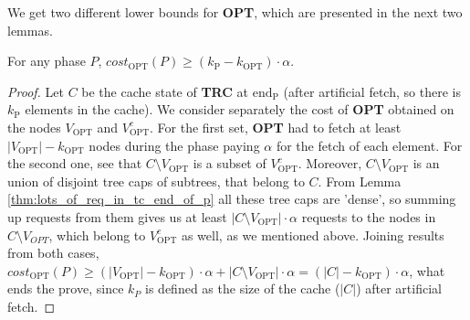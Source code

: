 We get two different lower bounds for \textbf{OPT}, which are presented in the
next two lemmas.
\begin{lemma}
For any phase $P$, $cost_{\mathrm{OPT}}(P) \geq
(k_{\mathrm{P}} - k_{\mathrm{OPT}}) \cdot \alpha$.  \label{thm:opt_bound_with_k}
\end{lemma}
\begin{proof}
Let $C$ be the cache state of \textbf{TRC} at
$\mathrm{end_P}$ (after artificial fetch, so there is $k_{\mathrm{P}}$ elements in the
cache). We consider separately the cost of \textbf{OPT} obtained on the nodes
$V_{\mathrm{OPT}}$ and $V_{\mathrm{OPT}}^c$. For the first set, \textbf{OPT} had
to fetch at least $|V_{\mathrm{OPT}}| - k_{\mathrm{OPT}}$ nodes during the phase
paying $\alpha$ for the fetch of each element. For the second one, see that $C \setminus
V_{\mathrm{OPT}}$ is a subset of $V_{\mathrm{OPT}}^c$. Moreover, $C \setminus
V_{\mathrm{OPT}}$ is an union of disjoint tree caps of subtrees, that belong to
$C$. From Lemma \ref{thm:lots_of_req_in_tc_end_of_p} all these tree caps are
'dense', so summing up requests from them gives us at least $|C \setminus
V_{\mathrm{OPT}}| \cdot \alpha$ requests to the nodes in $C \setminus V_{OPT}$,
which belong to $V_{\mathrm{OPT}}^c$ as well, as we mentioned above. Joining
results from both cases, $cost_{\mathrm{OPT}}(P) \geq (|V_{\mathrm{OPT}}| -
k_{\mathrm{OPT}}) \cdot \alpha + |C \setminus V_{\mathrm{OPT}}| \cdot \alpha =
(|C| - k_{\mathrm{OPT}}) \cdot \alpha$, what ends the prove, since $k_P$ is
defined as the size of the cache ($|C|$) after artificial fetch.
\end{proof}
